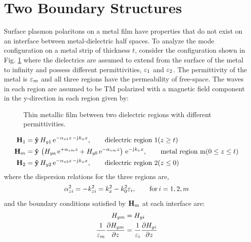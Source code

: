 \documentclass[11pt]{article}
\begin{document}
\section{Two Boundary Structures}
%
Surface plasmon polaritons on a metal film have properties that do not exist on an interface between metal-dielectric half spaces. To analyze the mode configuration on a metal strip of thickness $t$, consider the configuration shown in Fig. \ref{fig:3layer} where the dielectrics are assumed to extend from the surface of the metal to infinity and possess different permittivities, $\varepsilon_1$ and $\varepsilon_2$. The permittivity of the metal is $\varepsilon_m$ and all three regions have the permeability of free-space. The waves in each region are assumed to be TM polarized with a magnetic field component in the y-direction in each region given by:
%
\begin{figure}[b!]
  \centering
  \def\svgwidth{.75\linewidth}
  
  \caption{Thin metallic film between two dielectric regions with different permittivities.}
  \label{fig:3layer}
\end{figure}
%
\begin{subequations}
  \begin{align}
    \mathbf{H}_1 ={}& \mathbf{\hat{y}} \,H_{y1} \, \mathrm{e}^{ -\alpha_{z1}z \,- \mathrm{j}\mkern1mu k_x x}, \qquad	 		\text{dielectric region 1} (z \ge t)
    \label{eq:H1_3layer}\\
    \mathbf{H}_m ={}& \mathbf{\hat{y}} \,\left( H_{ya}\, \mathrm{e}^{ +\alpha_{zm}z} + H_{yb}\, \mathrm{e}^{ -\alpha_{zm}z} \right) \, \mathrm{e}^{ - \mathrm{j}\mkern1mu k_x x}, \qquad	 		\text{metal region m} (0 \le z \le t)
    \label{eq:Hm_3layer}\\
    \mathbf{H}_2 ={}& \mathbf{\hat{y}} \,H_{y2} \, \mathrm{e}^{ -\alpha_{z3}z \, - \mathrm{j}\mkern1mu k_x x}, \qquad	 		\text{dielectric region 2} (z \le 0)
    \label{eq:H2_3layer}
  \end{align}
  \label{eq:H_3layer}%
\end{subequations}
%
where the dispersion relations for the three regions are,
%
\begin{equation}
  \alpha_{zi}^2 = -k_{zi}^2 = k_x^2 - k_0^2 \varepsilon_i, \qquad	  \text{for} \,
  i=1,2,m
  \label{eq:3_layer_disp}
\end{equation}
%
and the boundary conditions satisfied by $\mathbf{H}_m$ at each interface are:
%
\begin{subequations}
  \begin{align}
    {H_{ym}} ={}& {H_{yi}}
    \label{eq:bc1_3layer}\\
    \frac{1}{\varepsilon_m}\pdv{H_{ym}}{z}  ={}& \frac{1}{\varepsilon_i}\pdv{H_{yi}}{z}
    \label{eq:bc2_3layer}
  \end{align}
  \label{eq:bc_3layer}%
\end{subequations}
\end{document}
